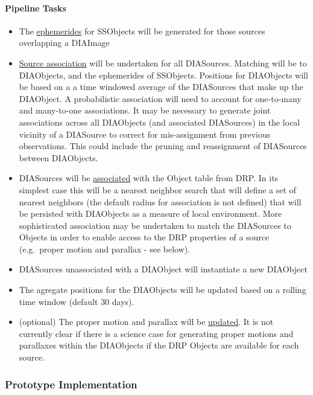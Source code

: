 \paragraph{Pipeline Tasks}
\begin{itemize}
\item The \hyperref[sec:acEphemerisCalculation]{ephemerides} for SSObjects will be generated for those sources overlapping a DIAImage
\item \hyperref[sec:acDIAObjectGeneration]{Source association} will be undertaken for all DIASources. Matching will be to DIAObjects, and the ephemerides of SSObjects. Positions for DIAObjects will be based on a a time windowed average of the DIASources that make up the DIAObject. A probabilistic association will need to account for one-to-many and many-to-one associations. It may be necessary to generate joint associations across all DIAObjects (and associated DIASources) in the local  vicinity of a DIASource to correct for mis-assignment from previous observations. This could include the pruning and reassignment of DIASources between DIAObjects.
\item DIASources will be \hyperref[sec:acDIAObjectGeneration]{associated} with the Object table from DRP. In its simplest case this will be a nearest neighbor search that will define a set of nearest neighbors (the default radius for association is not defined) that will be persisted with DIAObjects as a measure of local environment. More sophisticated association may be undertaken to match the DIASources to Objects in order to enable access to the DRP properties of a source (e.g.\ proper motion and parallax - see below).
\item DIASources unassociated with a DIAObject will instantiate a new DIAObject
\item The agregate positions for the DIAObjects will be updated based on a rolling time window (default 30 days). 
\item (optional) The proper motion and parallax will be \hyperref[sec:acStellarMotionFitting]{updated}. It is not currently clear if there is a science case for generating proper motions and parallaxes within the DIAObjects if the DRP Objects are available for each source. 
\end{itemize}


\subsubsection{Prototype Implementation}

